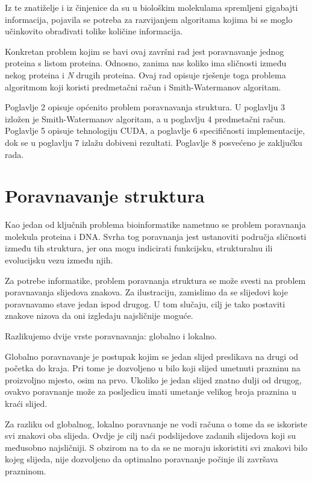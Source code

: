 \documentclass[times, utf8, zavrsni, numeric]{fer}
\begin{document}
Iz te znatiželje i iz činjenice da su u biološkim molekulama spremljeni gigabajti informacija, pojavila se potreba za razvijanjem algoritama kojima bi se moglo učinkovito obrađivati tolike količine informacija.

Konkretan problem kojim se bavi ovaj završni rad jest poravnavanje jednog proteina s listom proteina. Odnosno, zanima nas koliko ima sličnosti između nekog proteina i \textit{N} drugih proteina. Ovaj rad opisuje rješenje toga problema algoritmom koji koristi predmetačni račun i Smith-Watermanov algoritam.

Poglavlje 2 opisuje općenito problem poravnavanja struktura. U poglavlju 3 izložen je Smith-Watermanov algoritam, a u poglavlju 4 predmetačni račun.
Poglavlje 5 opisuje tehnologiju CUDA, a poglavlje 6 specifičnosti implementacije, dok se u poglavlju 7 izlažu dobiveni rezultati. Poglavlje 8 posvećeno je zaključku rada.


\chapter{Poravnavanje struktura}
\indent

Kao jedan od ključnih problema bioinformatike nametnuo se problem poravnanja molekula proteina i DNA. Svrha tog poravnanja jest ustanoviti područja sličnosti između tih struktura, jer ona mogu indicirati funkcijsku, strukturalnu ili evolucijsku vezu između njih.\cite{salign}

Za potrebe informatike, problem poravnanja struktura se može svesti na problem poravnavanja slijedova znakova. Za ilustraciju, zamislimo da se slijedovi koje poravnavamo stave jedan ispod drugog. U tom slučaju, cilj je tako postaviti znakove nizova da oni izgledaju najsličnije moguće.

Razlikujemo dvije vrste poravnavanja: globalno i lokalno.

Globalno poravnavanje je postupak kojim se jedan slijed preslikava na drugi od početka do kraja. Pri tome je dozvoljeno u bilo koji slijed umetnuti prazninu na proizvoljno mjesto, osim na prvo. Ukoliko je jedan slijed znatno dulji od drugog, ovakvo poravnanje može za posljedicu imati umetanje velikog broja praznina u kraći slijed.

Za razliku od globalnog, lokalno poravnanje ne vodi računa o tome da se iskoriste svi znakovi oba slijeda. Ovdje je cilj naći podslijedove zadanih slijedova koji su međusobno najsličniji. S obzirom na to da se ne moraju iskoristiti svi znakovi bilo kojeg slijeda, nije dozvoljeno da optimalno poravnanje počinje ili završava prazninom.
\end{document}
